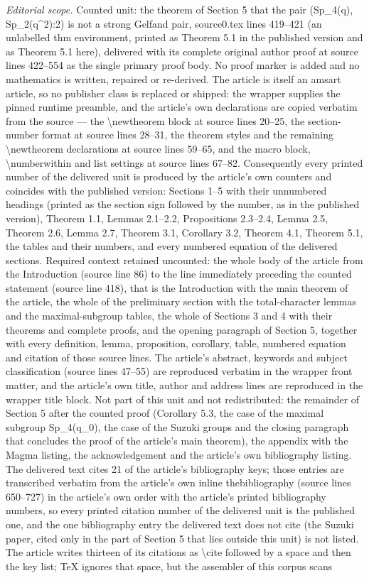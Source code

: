 \documentclass[10pt,a4paper]{amsart}
\theoremstyle{plain}
\theoremstyle{definition}
\numberwithin{equation}{section}
\begin{document}
\noindent\textit{Editorial scope.} Counted unit: the theorem of Section 5 that the pair (Sp\_4(q), Sp\_2(q\^{}2):2) is not a strong Gelfand pair, source0.tex lines 419--421 (an unlabelled thm environment, printed as Theorem 5.1 in the published version and as Theorem 5.1 here), delivered with its complete original author proof at source lines 422--554 as the single primary proof body. No proof marker is added and no mathematics is written, repaired or re-derived. The article is itself an amsart article, so no publisher class is replaced or shipped: the wrapper supplies the pinned runtime preamble, and the article's own declarations are copied verbatim from the source --- the \textbackslash{}newtheorem block at source lines 20--25, the section-number format at source lines 28--31, the theorem styles and the remaining \textbackslash{}newtheorem declarations at source lines 59--65, and the macro block, \textbackslash{}numberwithin and list settings at source lines 67--82. Consequently every printed number of the delivered unit is produced by the article's own counters and coincides with the published version: Sections 1--5 with their unnumbered headings (printed as the section sign followed by the number, as in the published version), Theorem 1.1, Lemmas 2.1--2.2, Propositions 2.3--2.4, Lemma 2.5, Theorem 2.6, Lemma 2.7, Theorem 3.1, Corollary 3.2, Theorem 4.1, Theorem 5.1, the tables and their numbers, and every numbered equation of the delivered sections. Required context retained uncounted: the whole body of the article from the Introduction (source line 86) to the line immediately preceding the counted statement (source line 418), that is the Introduction with the main theorem of the article, the whole of the preliminary section with the total-character lemmas and the maximal-subgroup tables, the whole of Sections 3 and 4 with their theorems and complete proofs, and the opening paragraph of Section 5, together with every definition, lemma, proposition, corollary, table, numbered equation and citation of those source lines. The article's abstract, keywords and subject classification (source lines 47--55) are reproduced verbatim in the wrapper front matter, and the article's own title, author and address lines are reproduced in the wrapper title block. Not part of this unit and not redistributed: the remainder of Section 5 after the counted proof (Corollary 5.3, the case of the maximal subgroup Sp\_4(q\_0), the case of the Suzuki groups and the closing paragraph that concludes the proof of the article's main theorem), the appendix with the Magma listing, the acknowledgement and the article's own bibliography listing. The delivered text cites 21 of the article's bibliography keys; those entries are transcribed verbatim from the article's own inline thebibliography (source lines 650--727) in the article's own order with the article's printed bibliography numbers, so every printed citation number of the delivered unit is the published one, and the one bibliography entry the delivered text does not cite (the Suzuki paper, cited only in the part of Section 5 that lies outside this unit) is not listed. The article writes thirteen of its citations as \textbackslash{}cite followed by a space and then the key list; TeX ignores that space, but the assembler of this corpus scans 
\end{document}
